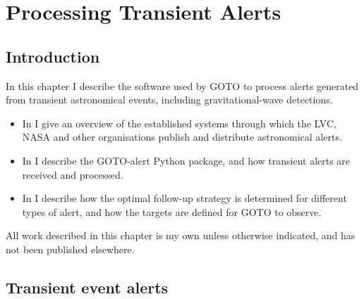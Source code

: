 
\chapter{Processing Transient Alerts}
\label{chap:alerts}


\chaptoc{}


\section{Introduction}
\label{sec:alerts_intro}


\begin{colsection}

In this chapter I describe the software used by GOTO to process alerts generated from transient astronomical events, including gravitational-wave detections.
%
\begin{itemize}
    \item In  I give an overview of the established systems through which the LVC, NASA and other organisations publish and distribute astronomical alerts.
    \item In  I describe the GOTO-alert Python package, and how transient alerts are received and processed.
    \item In  I describe how the optimal follow-up strategy is determined for different types of alert, and how the targets are defined for GOTO to observe.
\end{itemize}
%
All work described in this chapter is my own unless otherwise indicated, and has not been published elsewhere.

\end{colsection}


\section{Transient event alerts}
\label{sec:transient_alerts}


